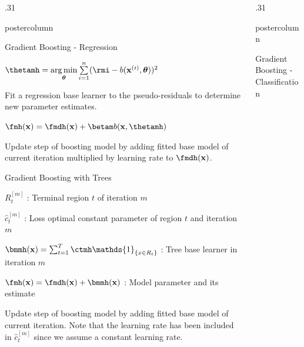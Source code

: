 \documentclass{beamer}
\newlength{\columnheight} %
\begin{document}
\begin{frame}[fragile]{}
\begin{columns}
\begin{column}{.31\textwidth}
\begin{beamercolorbox}[center]{postercolumn}
\begin{minipage}{.98\textwidth}
{\begin{myblock}{Gradient Boosting - Regression}
\begin{codebox}
							 $\thetamh = \argmin \limits_{\bm{\theta}} \sumin (\rmi - b(\xi, \bm{\theta}))^2$
						\end{codebox}
						\hspace*{1ex} Fit a regression base learner to the pseudo-residuals to determine new parameter estimates.\\
						\begin{codebox}
							 $\fmh(\xv) = \fmdh(\xv) + \betam b(\xv, \thetamh)$
						\end{codebox}
						\hspace*{1ex} Update step of boosting model by adding fitted base model of current iteration multiplied by learning rate to $\fmdh(\xv)$. \\
						\end{myblock}
					\begin{myblock}{Gradient Boosting with Trees}
						\begin{codebox}
							$R_t^{[m]}$ : Terminal region $t$ of iteration $m$
						\end{codebox}
						\hspace*{1ex}
						\begin{codebox}
							 $\hat{c}_t^{[m]}$ : Loss optimal constant parameter of region $t$ and iteration $m$
						\end{codebox}
						\hspace*{1ex} 
						\begin{codebox}
							 $\bmmh(\xv) = \sum_{t=1}^{T} \ctmh \mathds{1}_{\{x \in R_t\}}$ : Tree base learner in iteration $m$
						\end{codebox}
						\hspace*{1ex}
						\begin{codebox}
							 $\fmh(\xv) = \fmdh(\xv) + \bmmh(\xv)$ : Model parameter and its estimate
						\end{codebox}
						\hspace*{1ex} Update step of boosting model by adding fitted base model of current iteration. Note that the learning rate has been included in $\hat{c}_t^{[m]}$ since we assume a constant learning rate. \\
					\end{myblock}					
				}
			\end{minipage}
		\end{beamercolorbox}
	\end{column}


	\begin{column}{.31\textwidth}
		\begin{beamercolorbox}[center]{postercolumn}
			\begin{minipage}{.98\textwidth}
				\parbox[t][\columnheight]{\textwidth}{
				\begin{myblock}{Gradient Boosting - Classification}
						

\end{myblock}}
\end{minipage}
\end{beamercolorbox}
\end{column}
\end{columns}
\end{frame}
\end{document}
